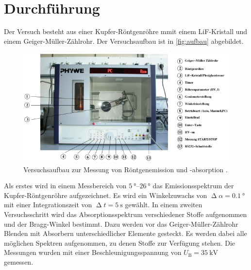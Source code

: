 \section{Durchführung}
\label{sec:Durchführung}
Der Versuch besteht aus einer Kupfer-Röntgenröhre mmit einem LiF-Kristall und einem Geiger-Müller-Zählrohr.
Der Versuchsaufbau ist in \autoref{fig:aufbau} abgebildet.
\begin{figure}[H]
    \centering
    \includegraphics[width = 0.7 \textwidth]{data/aufbau.png}
    \caption{Versuchsaufbau zur Messung von Röntgenemission und -absorption \cite{Anleitung602}.}
    \label{fig:aufbau}
\end{figure}
Als erstes wird in einem Messbereich von $\SIrange{5}{26}{\degree}$ das Emissionsspektrum der Kupfer-Röntgenröhre aufgezeichnet. Es wird ein Winkelzuwachs von 
$\upDelta \alpha = \SI{0,1}{\degree}$ mit einer Integrationszeit von $\upDelta t=\SI{5}{\second}$ gewählt. \newline
In einem zweiten Versuchsschritt wird das Absorptionsspektrum verschiedener Stoffe aufgenommen und der Bragg-Winkel bestimmt.
Dazu werden vor das Geiger-Müller-Zählrohr Blenden mit Absorbern unterschiedlicher Elemente gesteckt. Es werden dabei alle möglichen Spektren aufgenommen, zu denen Stoffe zur Verfügung stehen.
Die Messungen wurden mit einer Beschleunigungsspannung von $U_{\text{B}} = \SI{35}{\kilo\volt}$ gemessen.